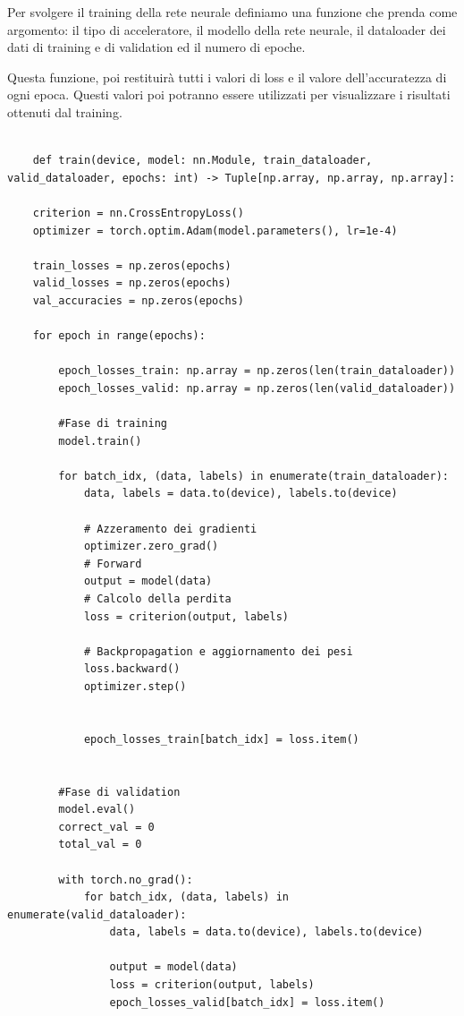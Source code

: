 Per svolgere il training della rete neurale definiamo una funzione
che prenda come argomento: il tipo di acceleratore, il modello della 
rete neurale, il dataloader dei dati di training e di validation ed il numero 
di epoche.

Questa funzione, poi restituirà tutti i valori di loss e il valore 
dell'accuratezza di ogni epoca. Questi valori poi potranno essere utilizzati 
per visualizzare i risultati ottenuti dal training.  


\begin{lstlisting}

    def train(device, model: nn.Module, train_dataloader, valid_dataloader, epochs: int) -> Tuple[np.array, np.array, np.array]:
    
    criterion = nn.CrossEntropyLoss() 
    optimizer = torch.optim.Adam(model.parameters(), lr=1e-4)
    
    train_losses = np.zeros(epochs)
    valid_losses = np.zeros(epochs)
    val_accuracies = np.zeros(epochs)

    for epoch in range(epochs):
        
        epoch_losses_train: np.array = np.zeros(len(train_dataloader))
        epoch_losses_valid: np.array = np.zeros(len(valid_dataloader))
        
        #Fase di training
        model.train() 

        for batch_idx, (data, labels) in enumerate(train_dataloader):
            data, labels = data.to(device), labels.to(device)
            
            # Azzeramento dei gradienti
            optimizer.zero_grad() 
            # Forward              
            output = model(data) 
            # Calcolo della perdita               
            loss = criterion(output, labels)    
            
            # Backpropagation e aggiornamento dei pesi
            loss.backward()
            optimizer.step()

        
            epoch_losses_train[batch_idx] = loss.item()
        
        
        #Fase di validation
        model.eval()
        correct_val = 0
        total_val = 0
       
        with torch.no_grad():
            for batch_idx, (data, labels) in enumerate(valid_dataloader):
                data, labels = data.to(device), labels.to(device)

                output = model(data)
                loss = criterion(output, labels)
                epoch_losses_valid[batch_idx] = loss.item()
                

\end{lstlisting}
